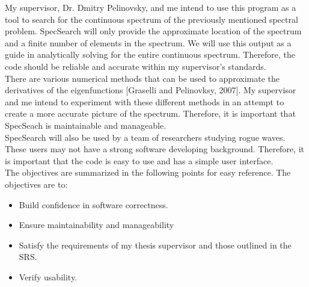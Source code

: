 \documentclass[12pt, titlepage]{article}
\begin{document}
	My supervisor, Dr. Dmitry Pelinovsky,  and me intend to use this program as a tool
        to search for the continuous spectrum of the previously mentioned
        spectral problem.  SpecSearch will only provide the approximate location
        of the spectrum and a finite number of elements in the spectrum.  We
        will use this output as a guide in analytically solving for the entire
        continuous spectrum.  Therefore, the
	code should be reliable and accurate within my supervisor's standards. \\
	
	There are various numerical methods that can be used to approximate the 
	derivatives of the eigenfunctions [Graselli and Pelinovksy, 2007]. My 
	supervisor and me intend to experiment with these different 
	methods in an attempt to create a more accurate picture of the spectrum. 
	Therefore, it is important that SpecSeach  is maintainable and 
	manageable. \\
	
	 SpecSearch will also be used by a team of researchers studying rogue 
	 waves. These users may not have a strong software 
	 developing background. Therefore, it is important that the code is easy to 
	 use and has a simple user interface. \\
	 
	 The objectives are summarized in the following points for easy reference. 
	 The objectives are to:
	
\begin{itemize}
	\item Build confidence in software correctness.
	\item Ensure maintainability and manageability 
	\item Satisfy the requirements of my thesis supervisor and those outlined 
	in the SRS. 
	\item Verify usability.	
\end{itemize}
\end{document}
